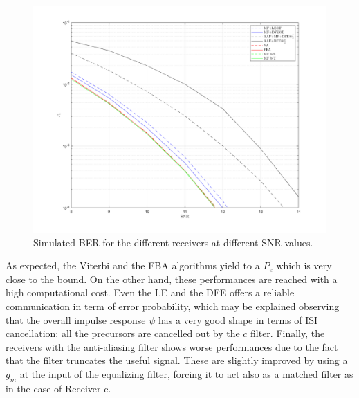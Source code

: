 \documentclass[a4paper, 12pt]{report}
\begin{document}
\begin{figure}[H]
	\centering
	\includegraphics[width=15cm]{images/PevsGamma}
	\caption{Simulated BER for the different receivers at different SNR values.}\label{Pe}
\end{figure}

As expected, the Viterbi and the FBA algorithms yield to a $P_e$ which is very close to the bound. On the other hand, these performances are reached with a high computational cost. Even the LE and the DFE offers a reliable communication in term of error probability, which may be explained observing that the overall impulse response $\psi$ has a very good shape in terms of ISI cancellation: all the precursors are cancelled out by the $c$ filter. Finally, the receivers with the anti-aliasing filter shows worse performances due to the fact that the filter truncates the useful signal. These are slightly improved by using a $g_m$ at the input of the equalizing filter, forcing it to act also as a matched filter as in the case of Receiver c.
\end{document}
